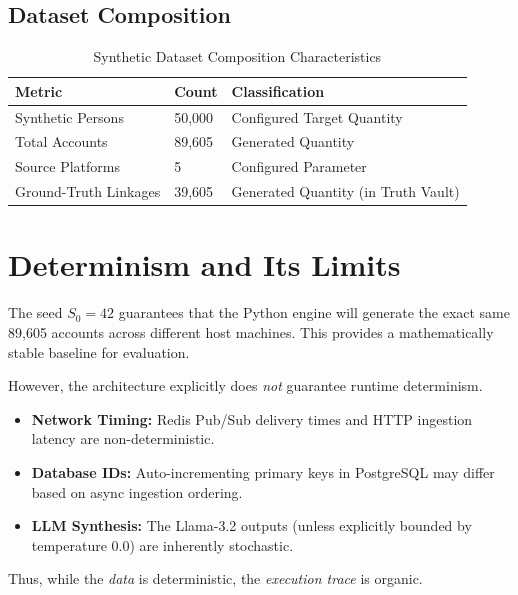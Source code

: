 \subsection{Dataset Composition}
\begin{table}[h]
\centering
\begin{tabular}{p{} p{} p{}}
\toprule
\textbf{Metric} & \textbf{Count} & \textbf{Classification} \\
\midrule
Synthetic Persons & 50,000 & Configured Target Quantity \\
Total Accounts & 89,605 & Generated Quantity \\
Source Platforms & 5 & Configured Parameter \\
Ground-Truth Linkages & 39,605 & Generated Quantity (in Truth Vault) \\
\bottomrule
\end{tabular}
\caption{Synthetic Dataset Composition Characteristics}
\label{tab:dataset-characteristics}
\end{table}

\section{Determinism and Its Limits}
\label{sec:exp-determinism}
The seed $S_0 = 42$ guarantees that the Python engine will generate the exact same 89,605 accounts across different host machines. This provides a mathematically stable baseline for evaluation.

However, the architecture explicitly does \textit{not} guarantee runtime determinism.
\begin{itemize}
    \item \textbf{Network Timing:} Redis Pub/Sub delivery times and HTTP ingestion latency are non-deterministic.
    \item \textbf{Database IDs:} Auto-incrementing primary keys in PostgreSQL may differ based on async ingestion ordering.
    \item \textbf{LLM Synthesis:} The Llama-3.2 outputs (unless explicitly bounded by temperature 0.0) are inherently stochastic.
\end{itemize}
Thus, while the \textit{data} is deterministic, the \textit{execution trace} is organic.

